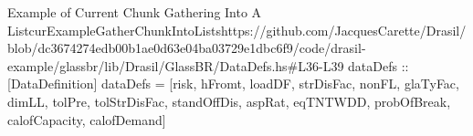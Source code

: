 \begin{haskell}{Example of Current Chunk Gathering Into A List}{curExampleGatherChunkIntoLists}{https://github.com/JacquesCarette/Drasil/blob/dc3674274edb00b1ae0d63e04ba03729e1dbc6f9/code/drasil-example/glassbr/lib/Drasil/GlassBR/DataDefs.hs\#L36-L39}
dataDefs :: [DataDefinition]
dataDefs = [risk, hFromt, loadDF, strDisFac, nonFL, glaTyFac,
  dimLL, tolPre, tolStrDisFac, standOffDis, aspRat, eqTNTWDD, probOfBreak,
  calofCapacity, calofDemand]
\end{haskell}
